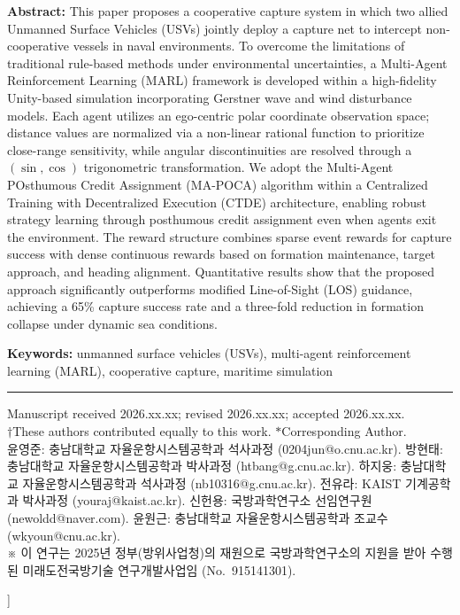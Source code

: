 \documentclass[9pt,twocolumn,a4paper]{extarticle}
\begin{document}
{\begin{@twocolumnfalse}
{\fontsize{9}{13.5}\selectfont \leftskip=7mm \rightskip=7mm
\noindent\textbf{Abstract:} This paper proposes a cooperative capture system in which two allied
Unmanned Surface Vehicles (USVs) jointly deploy a capture net to intercept non-cooperative vessels in
naval environments. To overcome the limitations of traditional rule-based methods under environmental
uncertainties, a Multi-Agent Reinforcement Learning (MARL) framework is developed within a
high-fidelity Unity-based simulation incorporating Gerstner wave and wind disturbance models. Each
agent utilizes an ego-centric polar coordinate observation space; distance values are normalized via a
non-linear rational function to prioritize close-range sensitivity, while angular discontinuities are
resolved through a $(\sin,\cos)$ trigonometric transformation. We adopt the Multi-Agent POsthumous
Credit Assignment (MA-POCA) algorithm within a Centralized Training with Decentralized Execution
(CTDE) architecture, enabling robust strategy learning through posthumous credit assignment even when
agents exit the environment. The reward structure combines sparse event rewards for capture success
with dense continuous rewards based on formation maintenance, target approach, and heading alignment.
Quantitative results show that the proposed approach significantly outperforms modified Line-of-Sight
(LOS) guidance, achieving a 65\% capture success rate and a three-fold reduction in formation collapse
under dynamic sea conditions.\par
\smallskip
\noindent\textbf{Keywords:} unmanned surface vehicles (USVs), multi-agent reinforcement learning (MARL),
cooperative capture, maritime simulation\par
}
\vspace{4mm}
\noindent\rule{\textwidth}{0.3pt}
{\scriptsize\par\smallskip
Manuscript received 2026.xx.xx; revised 2026.xx.xx; accepted 2026.xx.xx.\\
$\dagger$These authors contributed equally to this work. $*$Corresponding Author.\\
윤영준: 충남대학교 자율운항시스템공학과 석사과정 (0204jun@o.cnu.ac.kr).\;
방현태: 충남대학교 자율운항시스템공학과 박사과정 (htbang@g.cnu.ac.kr).\;
하지웅: 충남대학교 자율운항시스템공학과 석사과정 (nb10316@g.cnu.ac.kr).\;
전유라: KAIST 기계공학과 박사과정 (youraj@kaist.ac.kr).\;
신헌용: 국방과학연구소 선임연구원 (newoldd@naver.com).\;
윤원근: 충남대학교 자율운항시스템공학과 조교수 (wkyoun@cnu.ac.kr).\\
※ 이 연구는 2025년 정부(방위사업청)의 재원으로 국방과학연구소의 지원을 받아 수행된 미래도전국방기술 연구개발사업임 (No.~915141301).\par}
\vspace{3mm}
\end{@twocolumnfalse}
}]
\end{document}
